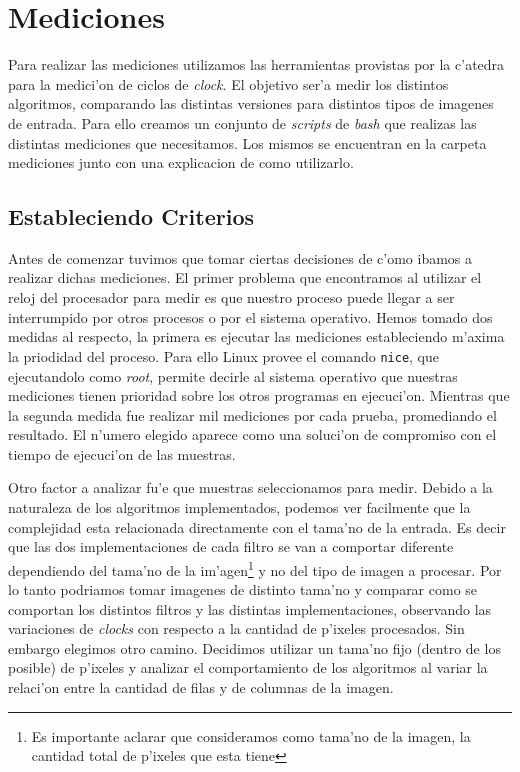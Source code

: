 \section{Mediciones}
Para realizar las mediciones utilizamos las herramientas provistas por la c'atedra para la medici'on de ciclos de \textit{clock}. El objetivo ser'a medir los distintos algoritmos, comparando las distintas versiones para distintos tipos de imagenes de entrada. Para ello creamos un conjunto de \textit{scripts} de \textit{bash} que realizas las distintas mediciones que necesitamos. Los mismos se encuentran en la carpeta mediciones junto con una explicacion de como utilizarlo.

\subsection{Estableciendo Criterios}

Antes de comenzar tuvimos que tomar ciertas decisiones de c'omo ibamos a realizar dichas mediciones. El primer problema que encontramos al utilizar el reloj del procesador para medir es que nuestro proceso puede llegar a ser interrumpido por otros procesos o por el sistema operativo. Hemos tomado dos medidas al respecto, la primera es ejecutar las mediciones estableciendo m'axima la priodidad del proceso. Para ello Linux provee el comando \texttt{nice}, que ejecutandolo como \textit{root}, permite decirle al sistema operativo que nuestras mediciones tienen prioridad sobre los otros programas en ejecuci'on. 
Mientras que la segunda medida fue realizar mil mediciones por cada prueba, promediando el resultado. El n'umero elegido aparece como una soluci'on de compromiso con el tiempo de ejecuci'on de las muestras.

Otro factor a analizar fu'e que muestras seleccionamos para medir. Debido a la naturaleza de los algoritmos implementados, podemos ver facilmente que la complejidad esta relacionada directamente con el tama'no de la entrada. Es decir que las dos implementaciones de cada filtro se van a comportar diferente dependiendo del tama'no de la im'agen\footnote{Es importante aclarar que consideramos como tama'no de la imagen, la cantidad total de p'ixeles que esta tiene} y no del tipo de imagen a procesar. Por lo tanto podriamos tomar imagenes de distinto tama'no y comparar como se comportan los distintos filtros y las distintas implementaciones, observando las variaciones de \textit{clocks} con respecto a la cantidad de p'ixeles procesados. Sin embargo elegimos otro camino. Decidimos utilizar un tama'no fijo (dentro de los posible) de p'ixeles y analizar el comportamiento de los algoritmos al variar la relaci'on entre la cantidad de filas y de columnas de la imagen. 

